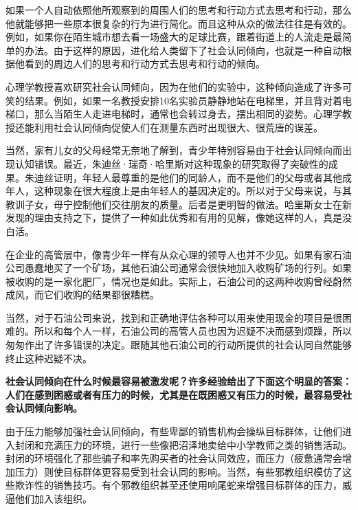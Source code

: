 如果一个人自动依照他所观察到的周围人们的思考和行动方式去思考和行动，那么他就能够把一些原本很复杂的行为进行简化。而且这种从众的做法往往是有效的。例如，如果你在陌生城市想去看一场盛大的足球比赛，跟着街道上的人流走是最简单的办法。由于这样的原因，进化给人类留下了社会认同倾向，也就是一种自动根据他看到的周边人们的思考和行动方式去思考和行动的倾向。
\par

心理学教授喜欢研究社会认同倾向，因为在他们的实验中，这种倾向造成了许多可笑的结果。例如，如果一名教授安排10名实验员静静地站在电梯里，并且背对着电梯口，那么当陌生人走进电梯时，通常也会转过身去，摆出相同的姿势。心理学教授还能利用社会认同倾向促使人们在测量东西时出现很大、很荒唐的误差。
\par

当然，家有儿女的父母经常无奈地了解到，青少年特别容易由于社会认同倾向而出现认知错误。最近，朱迪丝·瑞奇·哈里斯对这种现象的研究取得了突破性的成果。朱迪丝证明，年轻人最尊重的是他们的同龄人，而不是他们的父母或者其他成年人，这种现象在很大程度上是由年轻人的基因决定的。所以对于父母来说，与其教训子女，毋宁控制他们交往朋友的质量。后者是更明智的做法。哈里斯女士在新发现的理由支持之下，提供了一种如此优秀和有用的见解，像她这样的人，真是没白活。
\par

在企业的高管层中，像青少年一样有从众心理的领导人也并不少见。如果有家石油公司愚蠢地买了一个矿场，其他石油公司通常会很快地加入收购矿场的行列。如果被收购的是一家化肥厂，情况也是如此。实际上，石油公司的这两种收购曾经蔚然成风，而它们收购的结果都很糟糕。
\par

当然，对于石油公司来说，找到和正确地评估各种可以用来使用现金的项目是很困难的。所以和每个人一样，石油公司的高管人员也因为迟疑不决而感到烦躁，所以匆匆作出了许多错误的决定。跟随其他石油公司的行动所提供的社会认同自然能够终止这种迟疑不决。
\par

\textbf{社会认同倾向在什么时候最容易被激发呢？许多经验给出了下面这个明显的答案：人们在感到困惑或者有压力的时候，尤其是在既困惑又有压力的时候，最容易受社会认同倾向影响。}
\par

由于压力能够加强社会认同倾向，有些卑鄙的销售机构会操纵目标群体，让他们进入封闭和充满压力的环境，进行一些像把沼泽地卖给中小学教师之类的销售活动。封闭的环境强化了那些骗子和率先购买者的社会认同效应，而压力（疲惫通常会增加压力）则使目标群体更容易受到社会认同的影响。当然，有些邪教组织模仿了这些欺诈性的销售技巧。有个邪教组织甚至还使用响尾蛇来增强目标群体的压力，威逼他们加入该组织。
\par


